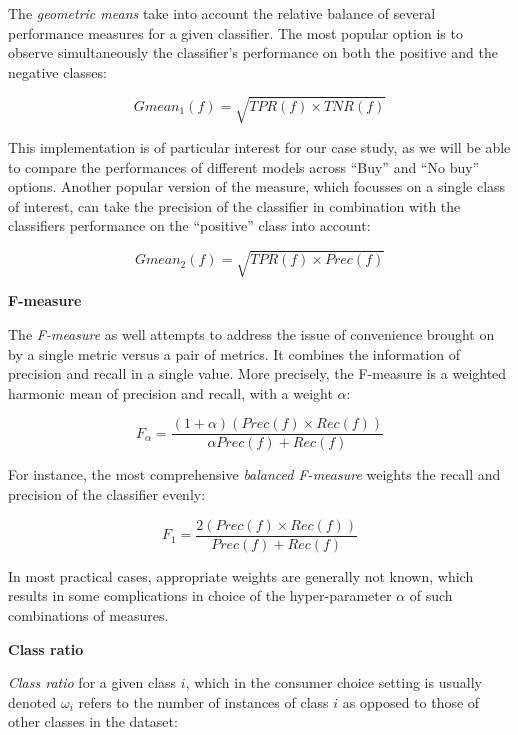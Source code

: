 \documentclass[12pt,]{article}
\begin{document}
The \emph{geometric means} take into account the relative balance of
several performance measures for a given classifier. The most popular
option is to observe simultaneously the classifier's performance on both
the positive and the negative classes:

\begin{equation}
Gmean_1 (f) = \sqrt{TPR (f) \times TNR (f)}
\end{equation}

This implementation is of particular interest for our case study, as we
will be able to compare the performances of different models across
``Buy'' and ``No buy'' options. Another popular version of the measure,
which focusses on a single class of interest, can take the precision of
the classifier in combination with the classifiers performance on the
``positive'' class into account:

\begin{equation}
Gmean_2 (f) = \sqrt{TPR (f) \times Prec (f)}
\end{equation}

\textbf{F-measure}

The \emph{F-measure} as well attempts to address the issue of
convenience brought on by a single metric versus a pair of metrics. It
combines the information of precision and recall in a single value. More
precisely, the F-measure is a weighted harmonic mean of precision and
recall, with a weight \(\alpha\):

\begin{equation}
F_{\alpha} = \frac
  {(1 + \alpha)(Prec (f) \times Rec (f))}
  {\alpha Prec (f) + Rec (f)}
\end{equation}

For instance, the most comprehensive \emph{balanced F-measure} weights
the recall and precision of the classifier evenly:

\begin{equation}
F_{1} = \frac
  {2(Prec (f) \times Rec (f))}
  {Prec (f) + Rec (f)}
\end{equation}

In most practical cases, appropriate weights are generally not known,
which results in some complications in choice of the hyper-parameter
\(\alpha\) of such combinations of measures.

\textbf{Class ratio}

\emph{Class ratio} for a given class \(i\), which in the consumer choice
setting is usually denoted \(\omega_i\) refers to the number of
instances of class \(i\) as opposed to those of other classes in the
dataset:
\end{document}
